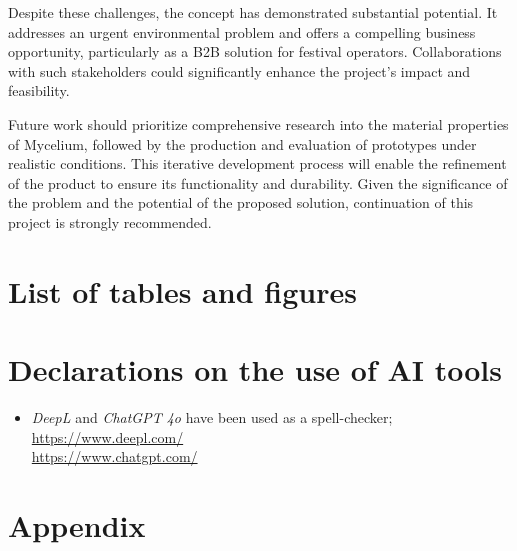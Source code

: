 \documentclass{article}
\begin{document}
Despite these challenges, the concept has demonstrated substantial potential. It addresses
an urgent environmental problem and offers a compelling business opportunity, particularly
as a B2B solution for festival operators. Collaborations with such stakeholders could
significantly enhance the project's impact and feasibility.

Future work should prioritize comprehensive research into the material properties of
Mycelium, followed by the production and evaluation of prototypes under realistic
conditions. This iterative development process will enable the refinement of the
product to ensure its functionality and durability. Given the significance of the problem
and the potential of the proposed solution, continuation of this project is strongly
recommended.

\section{List of tables and figures}
\listoftables

\listoffigures

\section{Declarations on the use of AI tools}
\begin{itemize}
    \item \textit{DeepL} and \textit{ChatGPT 4o} have been used as a spell-checker;\\
        \url{https://www.deepl.com/}\\
        \url{https://www.chatgpt.com/}
\end{itemize}

\setlength{\bibitemsep}{1.2\baselineskip}
\printbibliography[heading=none]

\section{Appendix}
\end{document}
